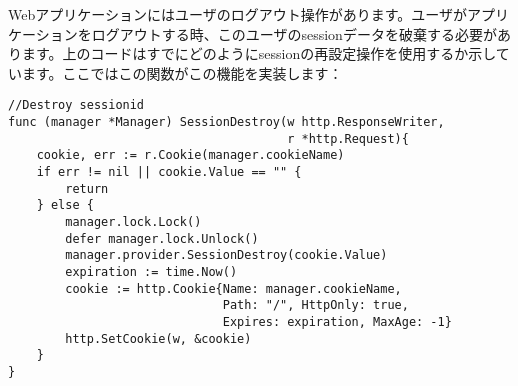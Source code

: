 Webアプリケーションにはユーザのログアウト操作があります。ユーザがアプリケーションをログアウトする時、このユーザのsessionデータを破棄する必要があります。上のコードはすでにどのようにsessionの再設定操作を使用するか示しています。ここではこの関数がこの機能を実装します：

\begin{lstlisting}[numbers=none]
//Destroy sessionid
func (manager *Manager) SessionDestroy(w http.ResponseWriter,
                                       r *http.Request){
    cookie, err := r.Cookie(manager.cookieName)
    if err != nil || cookie.Value == "" {
        return
    } else {
        manager.lock.Lock()
        defer manager.lock.Unlock()
        manager.provider.SessionDestroy(cookie.Value)
        expiration := time.Now()
        cookie := http.Cookie{Name: manager.cookieName,
                              Path: "/", HttpOnly: true,
                              Expires: expiration, MaxAge: -1}
        http.SetCookie(w, &cookie)
    }
}
\end{lstlisting}
